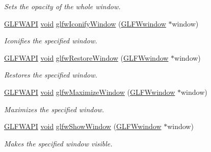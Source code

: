 \begin{DoxyCompactItemize}
\begin{DoxyCompactList}\small\item\em Sets the opacity of the whole window. \end{DoxyCompactList}\item 
\mbox{\hyperlink{glfw3_8h_a56da5036b2cc259351ae22fd6439bb47}{G\+L\+F\+W\+A\+PI}} \mbox{\hyperlink{glad_8h_a950fc91edb4504f62f1c577bf4727c29}{void}} \mbox{\hyperlink{group__window_ga24274e3c6ecd44e11fec5e6b66e4d7f3}{glfw\+Iconify\+Window}} (\mbox{\hyperlink{group__window_ga3c96d80d363e67d13a41b5d1821f3242}{G\+L\+F\+Wwindow}} $\ast$window)
\begin{DoxyCompactList}\small\item\em Iconifies the specified window. \end{DoxyCompactList}\item 
\mbox{\hyperlink{glfw3_8h_a56da5036b2cc259351ae22fd6439bb47}{G\+L\+F\+W\+A\+PI}} \mbox{\hyperlink{glad_8h_a950fc91edb4504f62f1c577bf4727c29}{void}} \mbox{\hyperlink{group__window_ga1e29caf0b819f578b04db52fff17256c}{glfw\+Restore\+Window}} (\mbox{\hyperlink{group__window_ga3c96d80d363e67d13a41b5d1821f3242}{G\+L\+F\+Wwindow}} $\ast$window)
\begin{DoxyCompactList}\small\item\em Restores the specified window. \end{DoxyCompactList}\item 
\mbox{\hyperlink{glfw3_8h_a56da5036b2cc259351ae22fd6439bb47}{G\+L\+F\+W\+A\+PI}} \mbox{\hyperlink{glad_8h_a950fc91edb4504f62f1c577bf4727c29}{void}} \mbox{\hyperlink{group__window_ga4f825a55367d3fabde3d06e7f30128e8}{glfw\+Maximize\+Window}} (\mbox{\hyperlink{group__window_ga3c96d80d363e67d13a41b5d1821f3242}{G\+L\+F\+Wwindow}} $\ast$window)
\begin{DoxyCompactList}\small\item\em Maximizes the specified window. \end{DoxyCompactList}\item 
\mbox{\hyperlink{glfw3_8h_a56da5036b2cc259351ae22fd6439bb47}{G\+L\+F\+W\+A\+PI}} \mbox{\hyperlink{glad_8h_a950fc91edb4504f62f1c577bf4727c29}{void}} \mbox{\hyperlink{group__window_ga7945bcdff9e5e058cf36505d6873ed8c}{glfw\+Show\+Window}} (\mbox{\hyperlink{group__window_ga3c96d80d363e67d13a41b5d1821f3242}{G\+L\+F\+Wwindow}} $\ast$window)
\begin{DoxyCompactList}\small\item\em Makes the specified window visible. \end{DoxyCompactList}\item 

\end{DoxyCompactItemize}
